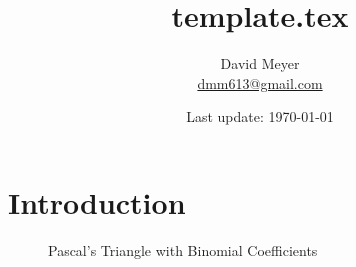 \documentclass{article}
\title{template.tex}
\author{David Meyer \\ \href{mailto:dmm613@gmail.com}
                            {dmm613@gmail.com}}
\date{Last update: \today}
\theoremstyle{definition}
\begin{document}
\maketitle
%
%
%
\section{Introduction}
\label{sec:introduction}

%
%

%
%
\newcommand \nrows {14}                                                 %
%
%
%
\begin{figure}[H]                                                       %
  \centering                                                            %
   \resizebox{0.75 \textwidth}{!} {                                     %
   }                                                                    %
  \caption{Pascal's Triangle with Binomial Coefficients}
  \label{fig:pascals_triangle_with_binomial_coefficients}
\end{figure}
\end{document}
